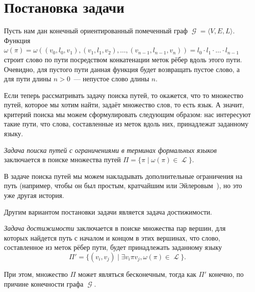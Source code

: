 \section{Постановка задачи}
	\label{sec:FLPQ_ProblemStatement}


Пусть нам дан конечный ориентированный помеченный граф $\mscrG = \langle V, E, L \rangle$.
Функция $\omega(\pi) = \omega((v_0, l_0, v_1), (v_1, l_1, v_2), \dots, (v_{n-1}, l_{n-1}, v_n)) = l_0 \cdot l_1 \cdot \dots \cdot l_{n-1}$ строит слово по пути посредством конкатенации меток рёбер вдоль этого пути.
Очевидно, для пустого пути данная функция будет возвращать пустое слово, а для пути длины $n  > 0$~--- непустое слово длины $n$.

Если теперь рассматривать задачу поиска путей, то окажется, что то множество путей, которое мы хотим найти, задаёт множество слов, то есть язык.
А значит, критерий поиска мы можем сформулировать следующим образом: нас интересуют такие пути, что слова, составленные из меток вдоль них, принадлежат заданному языку.

\begin{definition}
    \label{def:FLPQ}
    \emph{Задача поиска путей с ограничениями в терминах формальных языков} заключается в поиске множества путей $\Pi = \{\pi \mid \omega(\pi) \in \mscrL\}$.
\end{definition}

В задаче поиска путей мы можем накладывать дополнительные ограничения на путь (например, чтобы он был простым, кратчайшим или Эйлеровым~), но это уже другая история.

Другим вариантом постановки задачи является задача достижимости.

\begin{definition}
    \label{def:Reachability}
    \emph{Задача достижимости} заключается в поиске множества пар вершин, для которых найдется путь с началом и концом в этих вершинах, что слово, составленное из меток рёбер пути, будет принадлежать заданному языку
    \[\Pi' = \{(v_{i}, v_{j}) \mid \exists v_{i} \pi v_{j}, \omega(\pi) \in \mscrL\}.\]
\end{definition}

При этом, множество $\Pi$ может являться бесконечным, тогда как $\Pi'$ конечно, по причине конечности графа $\mscrG$.

